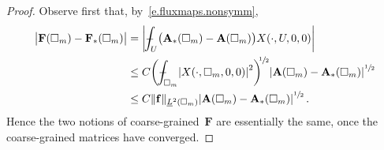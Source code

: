 \documentclass[11pt]{article} %
\let\oldsquare\square %
\renewcommand{\square}{\oldsquare}
\numberwithin{equation}{section}
\theoremstyle{definition}
\let\originalleft\left
\let\originalright\right
\renewcommand{\left}{\mathopen{}\mathclose\bgroup\originalleft}
\renewcommand{\right}{\aftergroup\egroup\originalright}
\newcommand{\f}{\mathbf{f}}
\newcommand{\cu}{\square}
\def\Xint#1{\mathchoice
{\XXint\displaystyle\textstyle{#1}}%
{\XXint\textstyle\scriptstyle{#1}}%
{\XXint\scriptstyle\scriptscriptstyle{#1}}%
{\XXint\scriptscriptstyle\scriptscriptstyle{#1}}%
\!\int}
\def\XXint#1#2#3{{\setbox0=\hbox{$#1{#2#3}{\int}$}
\vcenter{\hbox{$#2#3$}}\kern-.5\wd0}}
\def\fint{\Xint-}
\newcommand{\bfA}{\mathbf{A}}
\newcommand{\bfF}{\mathbf{F}}
\begin{document}
\begin{proof}
Observe first that, by~\eqref{e.fluxmaps.nonsymm}, 
\begin{align} \label{e.F.vs.Fstar}
\bigl|\bfF(\cu_m) - \bfF_*(\cu_m)   \bigr| 
&=
\biggl| \fint_U \bigl( \bfA_*(\cu_m) - \bfA(\cu_m)  \bigr) X(\cdot,U,0,0) \biggr|
\notag \\ & 
\leq 
C \left( \fint_{\cu_m} \left| X(\cdot,\cu_m,0,0) \right|^2 \right)^{\!\!\sfrac12} 
\left| \bfA(\cu_m) - \bfA_*(\cu_m) \right|^{\sfrac12} 
\notag \\ & 
\leq 
C \| \f \|_{\underline{L}^2(\cu_m)}  \left| \bfA(\cu_m) - \bfA_*(\cu_m) \right|^{\sfrac12} 
\,.
\end{align}
Hence the two notions of coarse-grained~$\bfF$ are essentially the same, once the coarse-grained matrices have converged. 

\smallskip


\end{proof}
\end{document}
